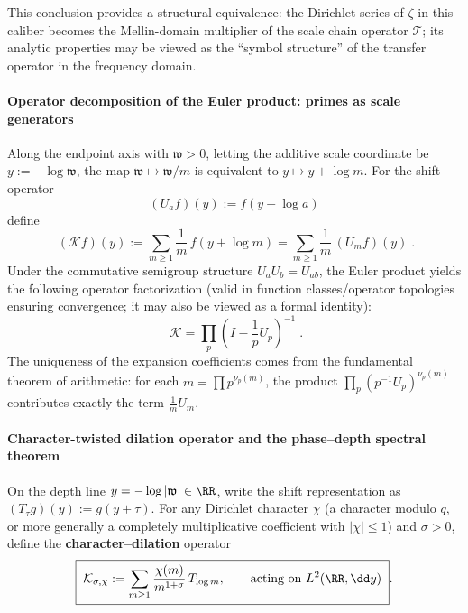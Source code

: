 This conclusion provides a structural equivalence: the Dirichlet series of \(\zeta\) in this caliber becomes the Mellin-domain multiplier of the scale chain operator \(\mathcal{T}\); its analytic properties may be viewed as the ``symbol structure'' of the transfer operator in the frequency domain.

\paragraph{Operator decomposition of the Euler product: primes as scale generators}
Along the endpoint axis with \(\mathfrak{w}>0\), letting the additive scale coordinate be \(y:=-\log \mathfrak{w}\), the map \(\mathfrak{w}\mapsto \mathfrak{w}/m\) is equivalent to \(y\mapsto y+\log m\).
For the shift operator
\begin{equation}\label{eq:scale-shift-operator}
\boxed{\;(U_{a}f)(y):=f(y+\log a)\; }
\end{equation}
define
\begin{equation}\label{eq:scale-K-operator}
\boxed{\;(\mathcal{K}f)(y):=\sum_{m\ge 1}\frac{1}{m}\,f(y+\log m)=\sum_{m\ge 1}\frac{1}{m}\,(U_m f)(y)\; }.
\end{equation}
Under the commutative semigroup structure \(U_aU_b=U_{ab}\), the Euler product yields the following operator factorization (valid in function classes/operator topologies ensuring convergence; it may also be viewed as a formal identity):
\begin{equation}\label{eq:scale-euler-operator-product}
\boxed{\;\mathcal{K}=\prod_{p}\left(I-\frac{1}{p}U_{p}\right)^{-1}\; }.
\end{equation}
The uniqueness of the expansion coefficients comes from the fundamental theorem of arithmetic: for each \(m=\prod p^{\nu_p(m)}\), the product \(\prod_p (p^{-1}U_p)^{\nu_p(m)}\) contributes exactly the term \(\frac{1}{m}U_m\).

\paragraph{Character-twisted dilation operator and the phase--depth spectral theorem}
On the depth line \(y=-\log|\mathfrak{w}|\in\RR\), write the shift representation as \((T_{\tau}g)(y):=g(y+\tau)\).
For any Dirichlet character \(\chi\) (a character modulo \(q\), or more generally a completely multiplicative coefficient with \(|\chi|\le 1\)) and \(\sigma>0\), define the \textbf{character--dilation} operator
\begin{equation}\label{eq:scale-K-sigma-chi}
\boxed{\;
\mathcal{K}_{\sigma,\chi}:=\sum_{m\ge 1}\frac{\chi(m)}{m^{1+\sigma}}\,T_{\log m},
\qquad\text{acting on }L^2(\RR,\dd y)\; }.
\end{equation}

